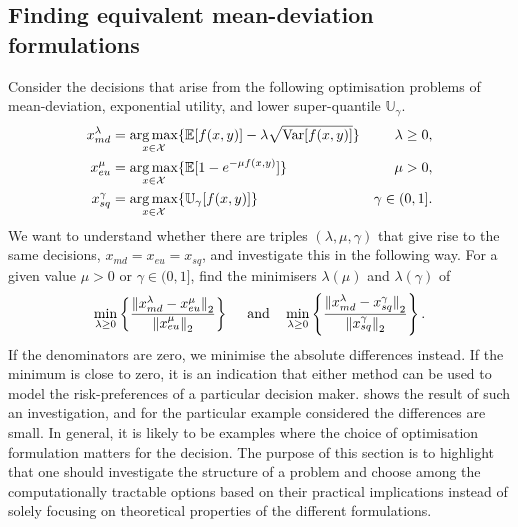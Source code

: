 \documentclass[main.tex]{subfiles}
\begin{document}
\subsection{Finding equivalent mean-deviation formulations}
Consider the decisions that arise from the following
optimisation problems of mean-deviation, exponential utility, and
lower super-quantile $\mathbb{U}_\gamma$.
\begin{align}\label{eq:optim_formulations_md}
  x_{md}^\lambda
  &=\operatorname*{arg\,max}_{x\in\mathcal{X}}\{\mathbb{E}[f(x,y)]-\lambda\sqrt{\mbox{Var}[f(x,y)]}\}
  &\lambda\geq 0,\\\label{eq:optim_formulations_eu}
  x_{eu}^\mu
  &=\operatorname*{arg\,max}_{x\in\mathcal{X}}\{
    \mathbb{E}[1-e^{-\mu f(x,y)}]\}
  &\mu>0,\\\label{eq:optim_formulations_sq}
  x_{sq}^\gamma
  &=\operatorname*{arg\,max}_{x\in\mathcal{X}}
    \{\mathbb{U}_\gamma[f(x,y)]\}
  &\gamma\in(0,1].
\end{align}
We want to understand whether there are triples $(\lambda,\mu,\gamma)$ that give rise
to the same decisions, $x_{md}=x_{eu}=x_{sq}$, and investigate this in
the following way.
For a given value $\mu>0$ or $\gamma\in(0,1]$, find the minimisers
$\lambda(\mu)$ and $\lambda(\gamma)$ of
\begin{equation}\label{eq:min_xmd_xeu_xsq}
  \min_{\lambda\geq 0}\left\{\frac{{\|x_{md}^\lambda-x_{eu}^\mu\|}_2}{{{\|x_{eu}^\mu}\|}_2}\right\}\quad
  \textnormal{ and}\quad
  \min_{\lambda\geq 0}\left\{\frac{{\|x_{md}^\lambda-x_{sq}^\gamma\|}_2}{{{\|x_{sq}^\gamma}\|}_2}\right\}.
\end{equation}
If the denominators are zero, we minimise the absolute differences instead.
If the minimum is close to zero, it is an indication that either method
can be used to model the risk-preferences of a particular decision maker.
 shows the result of such an investigation,
and for the particular example considered the differences are small.
In general, it is likely to be examples where the choice of
optimisation formulation matters for the decision. The purpose of this
section is to highlight that one should investigate the structure of
a problem and choose among the computationally tractable options based
on their practical implications instead of solely focusing on
theoretical properties of the different formulations.
\end{document}
